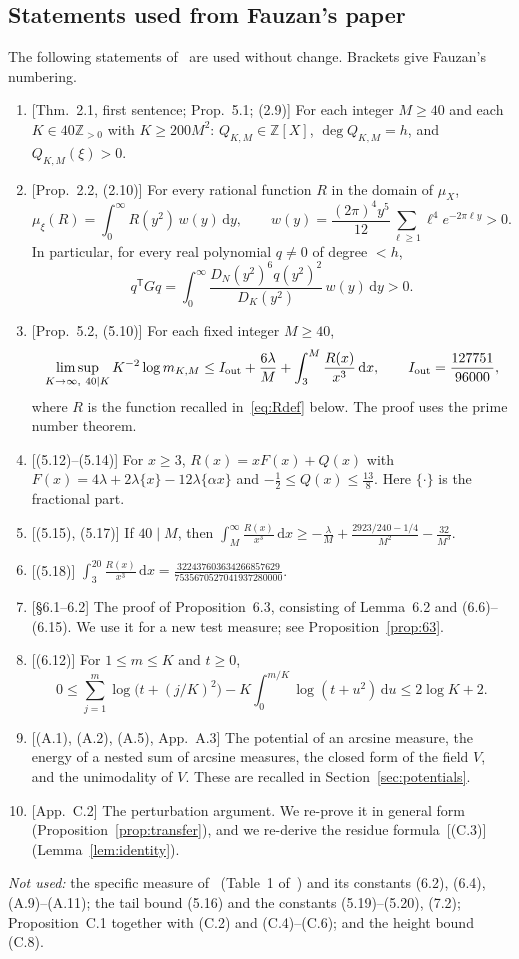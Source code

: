 \documentclass[11pt]{article}
\theoremstyle{remark}
\newcommand{\Z}{\mathbb{Z}}
\newcommand{\dd}{\mathrm{d}}
\newcommand{\T}{\mathsf{T}}
\begin{document}
\subsection{Statements used from Fauzan's paper}\label{sec:used}

The following statements of~\cite{F} are used without change. Brackets give Fauzan's numbering.
\begin{enumerate}[label=(F\arabic*),leftmargin=3.2em]
\item\label{F1} [Thm.~2.1, first sentence; Prop.~5.1; (2.9)] For each integer $M\ge40$ and each $K\in40\Z_{>0}$ with $K\ge200M^2$: $Q_{K,M}\in\Z[X]$, $\deg Q_{K,M}=h$, and $Q_{K,M}(\xi)>0$.
\item\label{F2} [Prop.~2.2, (2.10)] For every rational function $R$ in the domain of $\mu_X$,
\[
\mu_\xi(R)=\int_0^\infty R(y^2)\,w(y)\,\dd y,\qquad w(y)=\frac{(2\pi)^4y^5}{12}\sum_{\ell\ge1}\ell^4e^{-2\pi\ell y}>0 .
\]
In particular, for every real polynomial $q\ne0$ of degree $<h$,
\[
q^\T Gq=\int_0^\infty\frac{D_N(y^2)^6q(y^2)^2}{D_K(y^2)}\,w(y)\,\dd y>0 .
\]
\item\label{F3} [Prop.~5.2, (5.10)] For each fixed integer $M\ge40$,
\[
\limsup_{K\to\infty,\ 40\mid K}K^{-2}\log m_{K,M}\le I_{\rm out}+\frac{6\lambda}{M}+\int_3^M\frac{R(x)}{x^3}\,\dd x,\qquad I_{\rm out}=\frac{127751}{96000},
\]
where $R$ is the function recalled in~\eqref{eq:Rdef} below. The proof uses the prime number theorem.
\item\label{F4} [(5.12)--(5.14)] For $x\ge3$, $R(x)=xF(x)+Q(x)$ with $F(x)=4\lambda+2\lambda\{x\}-12\lambda\{\alpha x\}$ and $-\frac12\le Q(x)\le\frac{13}{8}$. Here $\{\cdot\}$ is the fractional part.
\item\label{F5} [(5.15), (5.17)] If $40\mid M$, then $\displaystyle\int_M^\infty\frac{R(x)}{x^3}\,\dd x\ge-\frac{\lambda}{M}+\frac{2923/240-1/4}{M^2}-\frac{32}{M^3}$.
\item\label{F6} [(5.18)] $\displaystyle\int_3^{20}\frac{R(x)}{x^3}\,\dd x=\frac{322437603634266857629}{7535670527041937280000}$.
\item\label{F7} [\S6.1--6.2] The proof of Proposition~6.3, consisting of Lemma~6.2 and (6.6)--(6.15). We use it for a new test measure; see Proposition~\ref{prop:63}.
\item\label{F8} [(6.12)] For $1\le m\le K$ and $t\ge0$,
\[
0\le\sum_{j=1}^m\log\bigl(t+(j/K)^2\bigr)-K\int_0^{m/K}\log(t+u^2)\,\dd u\le2\log K+2 .
\]
\item\label{F9} [(A.1), (A.2), (A.5), App.~A.3] The potential of an arcsine measure, the energy of a nested sum of arcsine measures, the closed form of the field $V$, and the unimodality of $V$. These are recalled in Section~\ref{sec:potentials}.
\item\label{F10} [App.~C.2] The perturbation argument. We re-prove it in general form (Proposition~\ref{prop:transfer}), and we re-derive the residue formula~[(C.3)] (Lemma~\ref{lem:identity}).
\end{enumerate}
\emph{Not used:} the specific measure of~\cite[Lemma~6.1]{F} (Table~1 of~\cite{F}) and its constants (6.2), (6.4), (A.9)--(A.11); the tail bound (5.16) and the constants (5.19)--(5.20), (7.2); Proposition~C.1 together with (C.2) and (C.4)--(C.6); and the height bound (C.8).
\end{document}

